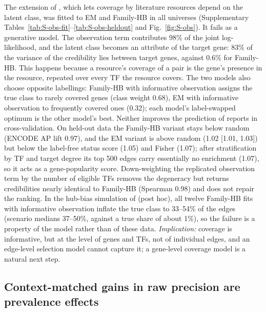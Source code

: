 \documentclass[11pt,a4paper]{article}
\begin{document}
The extension of , which lets coverage by literature resources depend on the latent class, was fitted to EM and Family-HB in all universes (Supplementary Tables~\ref{tab:S-obs-fit}--\ref{tab:S-obs-heldout} and Fig.~\ref{fig:S-obs}).
It fails as a generative model.
The observation term contributes 98\% of the joint log-likelihood, and the latent class becomes an attribute of the target gene: 83\% of the variance of the credibility lies between target genes, against 0.6\% for Family-HB.
This happens because a resource's coverage of a pair is the gene's presence in the resource, repeated over every TF the resource covers.
The two models also choose opposite labellings: Family-HB with informative observation assigns the true class to rarely covered genes (class weight 0.68), EM with informative observation to frequently covered ones (0.32); each model's label-swapped optimum is the other model's best.
Neither improves the prediction of reports in cross-validation.
On held-out data the Family-HB variant stays below random (ENCODE AP lift 0.97), and the EM variant is above random (1.02 [1.01, 1.03]) but below the label-free status score (1.05) and Fisher (1.07); after stratification by TF and target degree its top 500 edges carry essentially no enrichment (1.07), so it acts as a gene-popularity score.
Down-weighting the replicated observation term by the number of eligible TFs removes the degeneracy but returns credibilities nearly identical to Family-HB (Spearman 0.98) and does not repair the ranking.
In the hub-bias simulation of  (post hoc), all twelve Family-HB fits with informative observation inflate the true class to 33--54\% of the edges (scenario medians 37--50\%, against a true share of about 1\%), so the failure is a property of the model rather than of these data.
\emph{Implication:} coverage is informative, but at the level of genes and TFs, not of individual edges, and an edge-level selection model cannot capture it; a gene-level coverage model is a natural next step.

\subsection{Context-matched gains in raw precision are prevalence effects}\label{sec:res-universe}
\end{document}
